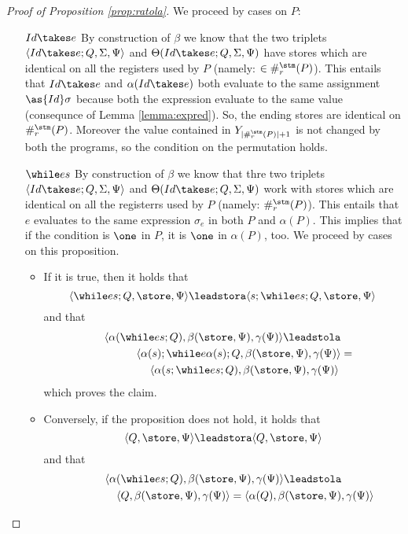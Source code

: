\begin{proof}[Proof of Proposition \ref{prop:ratola}]
  We proceed by cases on $P$:
  \begin{itemize}
    \item[$Id \takes e$] By construction of $\beta$ we know that the two triplets
    $\langle Id \takes e;Q, \Sigma, \Psi\rangle$ and
    $\Theta(Id \takes e;Q, \Sigma, \Psi)$ have stores which
    are identical on all the registers used by $P$ (namely: $\in \#_r^\stm(P)$).
    This entails that
    $Id \takes e$ and $\alpha(Id \takes e)$ both evaluate to the same assignment
    $\as {Id} \sigma$ because both the expression evaluate to the same value
    (consequnce of Lemma \ref{lemma:expred}).
    So, the ending stores are identical on $\#_r^\stm(P)$.
    Moreover the value contained in $Y_{|\#_r^\stm(P)|+1}$ is not changed by
    both the programs, so the condition on the permutation holds.
    \item[$\while e s$] By construction of $\beta$ we know that thre two triplets
    $\langle Id \takes e;Q, \Sigma, \Psi\rangle$ and
    $\Theta(Id \takes e;Q, \Sigma, \Psi)$ work with stores which
    are identical on all the registerrs used by $P$ (namely: $\#_r^\stm(P)$).
    This entails that
    $e$ evaluates to the same expression $\sigma_e$ in both $P$ and $\alpha(P)$.
    This implies that if the condition is $\one$ in $P$, it is $\one$ in
    $\alpha(P)$, too. We proceed by cases on this proposition.
    \begin{itemize}
      \item If it is true, then it holds that
          $$
          \langle \while e s; Q, \store, \Psi\rangle \leadstora \langle s;\while e s; Q, \store, \Psi\rangle
          $$
          and that
          $$
          \begin{gathered}
          \langle \alpha(\while e s; Q), \beta(\store, \Psi), \gamma(\Psi)\rangle \leadstola\\\quad\quad\quad\quad \langle\alpha(s); \while e {\alpha(s)}; Q, \beta(\store, \Psi), \gamma(\Psi)\rangle =
          \\\quad\quad\quad\quad\langle\alpha(s;\while e s; Q), \beta(\store, \Psi), \gamma(\Psi)\rangle
          \end{gathered}
          $$
          which proves the claim.
      \item Conversely, if the proposition does not hold, it holds that
          $$
          \langle Q, \store, \Psi\rangle \leadstora \langle Q, \store, \Psi\rangle
          $$
          and that
          $$
          \begin{gathered}
          \langle \alpha(\while e s; Q), \beta(\store, \Psi), \gamma(\Psi)\rangle \leadstola\\\quad\quad\quad\quad \langle Q, \beta(\store, \Psi), \gamma(\Psi)\rangle = \langle\alpha(Q), \beta(\store, \Psi), \gamma(\Psi)\rangle

\end{gathered}$$
\end{itemize}
\end{itemize}
\end{proof}
